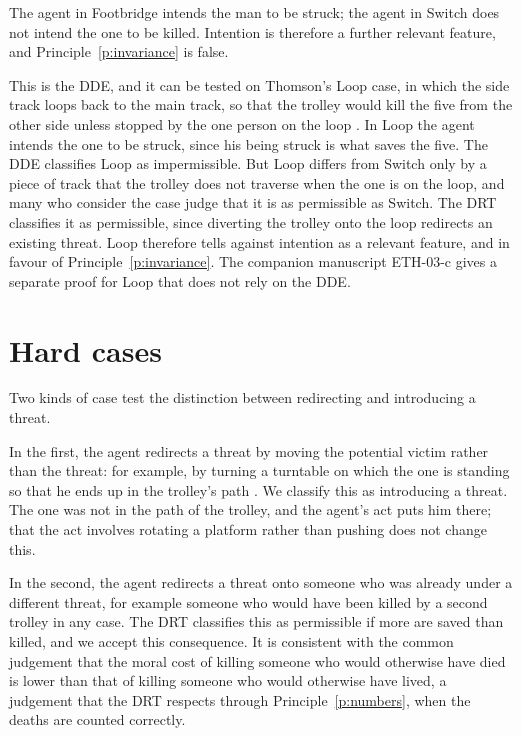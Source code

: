 \documentclass{situationist-preprint}
\begin{document}
\begin{objection}[Intention]
The agent in Footbridge intends the man to be struck; the agent in Switch does not intend the one to be killed. Intention is therefore a further relevant feature, and Principle~\ref{p:invariance} is false.
\end{objection}

\begin{reply}
This is the DDE, and it can be tested on Thomson's Loop case, in which the side track loops back to the main track, so that the trolley would kill the five from the other side unless stopped by the one person on the loop \citep{Thomson1985}. In Loop the agent intends the one to be struck, since his being struck is what saves the five. The DDE classifies Loop as impermissible. But Loop differs from Switch only by a piece of track that the trolley does not traverse when the one is on the loop, and many who consider the case judge that it is as permissible as Switch. The DRT classifies it as permissible, since diverting the trolley onto the loop redirects an existing threat. Loop therefore tells against intention as a relevant feature, and in favour of Principle~\ref{p:invariance}. The companion manuscript ETH-03-c gives a separate proof for Loop that does not rely on the DDE.
\end{reply}

\section{Hard cases}

Two kinds of case test the distinction between redirecting and introducing a threat.

In the first, the agent redirects a threat by moving the potential victim rather than the threat: for example, by turning a turntable on which the one is standing so that he ends up in the trolley's path \citep{Thomson2008}. We classify this as introducing a threat. The one was not in the path of the trolley, and the agent's act puts him there; that the act involves rotating a platform rather than pushing does not change this.

In the second, the agent redirects a threat onto someone who was already under a different threat, for example someone who would have been killed by a second trolley in any case. The DRT classifies this as permissible if more are saved than killed, and we accept this consequence. It is consistent with the common judgement that the moral cost of killing someone who would otherwise have died is lower than that of killing someone who would otherwise have lived, a judgement that the DRT respects through Principle~\ref{p:numbers}, when the deaths are counted correctly.
\end{document}
